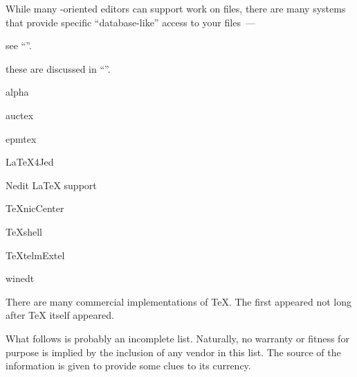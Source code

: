 While many \AllTeX{}-oriented editors can support work on \BibTeX{}
files, there are many systems that provide specific ``database-like''
access to your \BibTeX{} files~---
\begin{hyperversion}
  see ``''.
\end{hyperversion}
\begin{flatversion}
  these are discussed in %
  ``''.
\end{flatversion}
\begin{ctanrefs}
\item[alpha]
\item[auctex]
\item[epmtex]
\item[LaTeX4Jed]
\item[Nedit LaTeX support]
\item[TeXnicCenter]
\item[TeXshell]
\item[TeXtelmExtel]
\item[winedt]
\end{ctanrefs}


There are many commercial implementations of \TeX{}. The first
appeared not long after \TeX{} itself appeared.

What follows is probably an incomplete list.  Naturally, no warranty or
fitness for purpose is implied by the inclusion of any vendor in this
list.  The source of the information is given to provide some clues to
its currency.

